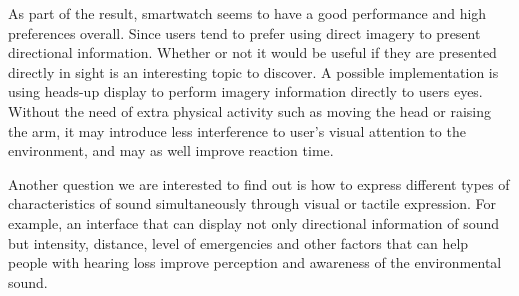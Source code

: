 \documentclass{sigchi}
\begin{document}
As part of the result, smartwatch seems to have a good performance and high preferences overall. Since users tend to prefer using direct imagery to present directional information. Whether or not it would be useful if they are presented directly in sight is an interesting topic to discover. A possible implementation is using heads-up display to perform imagery information directly to users eyes. Without the need of extra physical activity such as moving the head or raising the arm, it may introduce less interference to user's visual attention to the environment, and may as well improve reaction time.

Another question we are interested to find out is how to express different types of characteristics of sound simultaneously through visual or tactile expression. For example, an interface that can display not only directional information of sound but intensity, distance, level of emergencies and other factors that can help people with hearing loss improve perception and awareness of the environmental sound.

\balance



\end{document}
